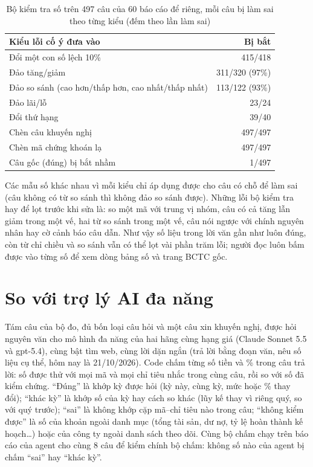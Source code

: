 \documentclass[12pt,a4paper]{report}
\newcommand{\enquote}[1]{“#1”}
\begin{document}
\begin{table}[H]
\centering\small
\caption{Bộ kiểm tra số trên 497 câu của 60 báo cáo để riêng, mỗi câu bị làm sai theo từng kiểu (đếm theo lần làm sai)}\label{tab:agent-guard}
\begin{tabularx}{\linewidth}{@{}Xr@{}}
\toprule
\textbf{Kiểu lỗi cố ý đưa vào} & \textbf{Bị bắt} \\ \midrule
Đổi một con số lệch 10\% & 415/418 \\
Đảo tăng/giảm & 311/320 (97\%) \\
Đảo so sánh (cao hơn/thấp hơn, cao nhất/thấp nhất) & 113/122 (93\%) \\
Đảo lãi/lỗ & 23/24 \\
Đổi thứ hạng & 39/40 \\
Chèn câu khuyến nghị & 497/497 \\
Chèn mã chứng khoán lạ & 497/497 \\
Câu gốc (đúng) bị bắt nhầm & 1/497 \\
\bottomrule
\end{tabularx}
\end{table}

Các mẫu số khác nhau vì mỗi kiểu chỉ áp dụng được cho câu có chỗ để làm sai (câu không có từ so sánh thì không đảo so sánh
được). Những lỗi bộ kiểm tra hay để lọt trước khi sửa là: so một mã với trung vị nhóm, câu có cả tăng lẫn giảm trong một
vế, hai từ so sánh trong một vế, câu nói ngược với chính nguyên nhân hay cờ cảnh báo câu dẫn. Như vậy số liệu trong lời văn
gần như luôn đúng, còn từ chỉ chiều và so sánh vẫn có thể lọt vài phần trăm lỗi; người đọc luôn bấm được vào từng số để xem
dòng bảng số và trang BCTC gốc.

\section{So với trợ lý AI đa năng}\label{sec:evaltrolyl}
Tám câu của bộ đo, đủ bốn loại câu hỏi và một câu xin khuyến nghị, được hỏi nguyên văn cho mô hình đa năng của hai hãng
cùng hạng giá (Claude Sonnet 5.5 và gpt-5.4), cùng bật tìm web, cùng lời dặn ngắn (trả lời bằng đoạn văn, nêu số liệu cụ thể,
hôm nay là 21/10/2026). Code chấm từng số tiền và \% trong câu trả lời: số được thử với mọi mã và mọi chỉ tiêu nhắc trong
cùng câu, rồi so với số đã kiểm chứng. \enquote{Đúng} là khớp kỳ được hỏi (kỳ này, cùng kỳ, mức hoặc \% thay đổi);
\enquote{khác kỳ} là khớp số của kỳ hay cách so khác (lũy kế thay vì riêng quý, so với quý trước); \enquote{sai} là không
khớp cặp mã--chỉ tiêu nào trong câu; \enquote{không kiểm được} là số của khoản ngoài danh mục (tổng tài sản, dư nợ, tỷ lệ
hoàn thành kế hoạch\ldots) hoặc của công ty ngoài danh sách theo dõi. Cùng bộ chấm chạy trên báo cáo của agent cho cùng 8
câu để kiểm chính bộ chấm: không số nào của agent bị chấm \enquote{sai} hay \enquote{khác kỳ}.
\end{document}
